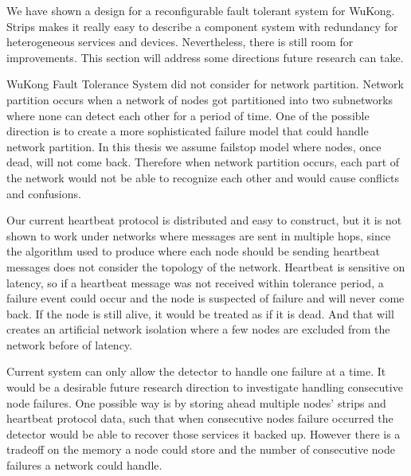 We have shown a design for a reconfigurable fault tolerant system for WuKong.
Strips makes it really easy to describe a component system with redundancy for
heterogeneous services and devices. Nevertheless, there is still room for
improvements. This section will address some directions future research can take.

WuKong Fault Tolerance System did not consider for network partition. Network
partition occurs when a network of nodes got partitioned into two subnetworks where
none can detect each other for a period of time. One of the possible direction
is to create a more sophisticated failure model that could handle network partition.
In this thesis we assume failstop model where nodes, once dead, will not come
back. Therefore when network partition occurs, each part of the network would
not be able to recognize each other and would cause conflicts and confusions.

Our current heartbeat protocol is distributed and easy to construct, but it is
not shown to work under networks where messages are sent in multiple hops, since
the algorithm used to produce where each node should be sending heartbeat
messages does not consider the topology of the network. Heartbeat is sensitive
on latency, so if a heartbeat message was not received within tolerance period,
a failure event could occur and the node is suspected of failure and will
never come back. If the node is still alive, it would be treated as if it is
dead. And that will creates an artificial network isolation where a few nodes
are excluded from the network before of latency.

Current system can only allow the detector to handle one failure at a time. It
would be a desirable future research direction to investigate handling
consecutive node failures. One possible way is by storing ahead multiple nodes'
strips and heartbeat protocol data, such that when consecutive nodes failure
occurred the detector would be able to recover those services it backed up.
However there is a tradeoff on the memory a node could store and the number of
consecutive node failures a network could handle.

\begin{comment}
Niels suggested that I show that I am aware of such issue with determining
optimality for deployment which is not clear for WuKong yet, there are many
ways or metrics to optimize for, all I can do in this work is to identify some
tradeoffs certain deployment for fault tolerance could influence the system
with certain metrics.

Limits will be hard to define here
Niels:about the tradeoffs in determining the deployment from your fault
tolerance perspective
Penn:Remember what the prof told me, about policy, first fit, last fit, etc
\end{comment}

